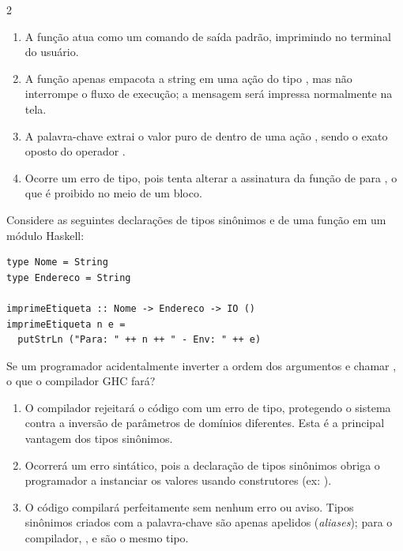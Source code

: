 \documentclass[a4paper,10pt,brazil]{article}
\begin{document}
\begin{multicols}{2}
\begin{enumerate}
  \item A função  atua como um comando de saída padrão, imprimindo  no terminal do usuário.

  \item A função  apenas empacota a string em uma ação do tipo , mas não interrompe o fluxo de execução; a mensagem  será impressa normalmente na tela.

  \item A palavra-chave  extrai o valor puro de dentro de uma ação , sendo o exato oposto do operador \haskellinline{<-}.

  \item Ocorre um erro de tipo, pois  tenta alterar a assinatura da função de  para , o que é proibido no meio de um bloco.


\end{enumerate}

Considere as seguintes declarações de tipos sinônimos e de uma função em um módulo Haskell:

\begin{verbatim}
type Nome = String
type Endereco = String

imprimeEtiqueta :: Nome -> Endereco -> IO ()
imprimeEtiqueta n e =
  putStrLn ("Para: " ++ n ++ " - Env: " ++ e)
\end{verbatim}

Se um programador acidentalmente inverter a ordem dos argumentos e chamar , o que o compilador GHC fará?

\begin{enumerate}
  \item O compilador rejeitará o código com um erro de tipo, protegendo o sistema contra a inversão de parâmetros de domínios diferentes. Esta é a principal vantagem dos tipos sinônimos.

  \item Ocorrerá um erro sintático, pois a declaração de tipos sinônimos obriga o programador a instanciar os valores usando construtores (ex: ).

  \item O código compilará perfeitamente sem nenhum erro ou aviso. Tipos sinônimos criados com a palavra-chave  são apenas apelidos (\emph{aliases}); para o compilador, ,  e  são o mesmo tipo.


\end{enumerate}
\end{multicols}
\end{document}
